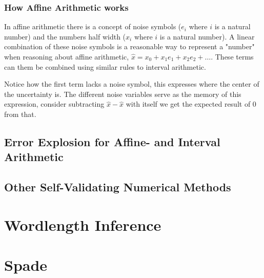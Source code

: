 \documentclass[msc,lith,english]{liuthesis}
\begin{document}
\subsubsection{How Affine Arithmetic works}
In affine arithmetic there is a concept of noise symbols ($e_i$ where $i$ is a natural number) and the numbers half width ($x_i$ where $i$ is a natural number). A linear combination of these noise symbols is a reasonable way to represent a "number" when reasoning about affine arithmetic, $\hat{x} = x_0 + x_1e_1 + x_2e_2 + \dots$. These terms can them be combined using similar rules to interval arithmetic.

Notice how the first term lacks a noise symbol, this expresses where the center of the uncertainty is. The different noise variables serve as the memory of this expression, consider subtracting $\hat{x} - \hat{x}$ with itself we get the expected result of 0 from that.

\subsection{Error Explosion for Affine- and Interval Arithmetic}


\cite{src:affAri}

\subsection{Other Self-Validating Numerical Methods}


\section{Wordlength Inference}


\section{Spade}
\end{document}
